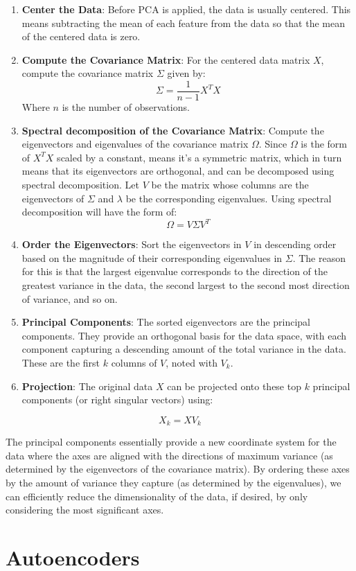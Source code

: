 \begin{enumerate}
    \item \textbf{Center the Data}: Before PCA is applied, the data is usually centered. This means subtracting the mean of each feature from the data so that the mean of the centered data is zero.
    \item \textbf{Compute the Covariance Matrix}: For the centered data matrix \(X\), compute the covariance matrix \(\Sigma\) given by: \[\Sigma = \frac{1}{n-1} X^T X\] Where \(n\) is the number of observations.
    \item \textbf{Spectral decomposition of the Covariance Matrix}: Compute the eigenvectors and eigenvalues of the covariance matrix \(\Omega\). Since \(\Omega\) is the form of \(X^T X\) scaled by a constant, means it's a symmetric matrix, which in turn means that its eigenvectors are orthogonal, and can be decomposed using spectral decomposition. Let \(V\) be the matrix whose columns are the eigenvectors of \(\Sigma\) and \(\lambda\) be the corresponding eigenvalues. Using spectral decomposition will have the form of:
\[\Omega = V \Sigma V^T \]
    \item \textbf{Order the Eigenvectors}: Sort the eigenvectors in \(V \) in descending order based on the magnitude of their corresponding eigenvalues in \(\Sigma\). The reason for this is that the largest eigenvalue corresponds to the direction of the greatest variance in the data, the second largest to the second most direction of variance, and so on.
    \item \textbf{Principal Components}: The sorted eigenvectors are the principal components. They provide an orthogonal basis for the data space, with each component capturing a descending amount of the total variance in the data. These are the first \(k\) columns of \(V\), noted with \(V_k\).
    \item \textbf{Projection}: The original data \(X\) can be projected onto these top \(k\) principal components (or right singular vectors) using:
\end{enumerate}

\[X_k=XV_k\]

The principal components essentially provide a new coordinate system for the data where the axes are aligned with the directions of maximum variance (as determined by the eigenvectors of the covariance matrix). By ordering these axes by the amount of variance they capture (as determined by the eigenvalues), we can efficiently reduce the dimensionality of the data, if desired, by only considering the most significant axes.

\section{Autoencoders}


